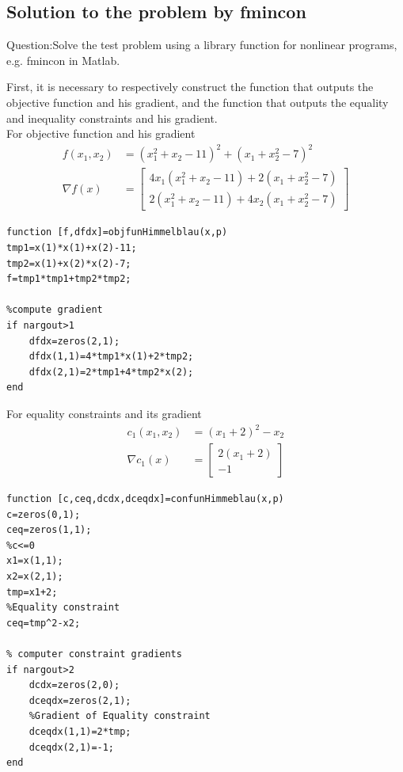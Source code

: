\subsection{\bfseries Solution to the problem by fmincon}
\begin{shaded}
{Question:Solve the test problem using a library function for nonlinear programs, e.g. fmincon in Matlab.}
\end{shaded}
First, it is necessary to respectively construct the function that outputs the objective function and his gradient, and the function that outputs the equality and inequality constraints and his gradient.\\[0.3cm]
For objective function and his gradient
\begin{align*}
    f(x_1,x_2)&=\left(x_1^2+x_2-11\right)^2+\left(x_1+x_2^2-7\right)^2\\
    \nabla f(x)&=\left[\begin{array}{l}
4 x_{1}\left(x_{1}^{2}+x_{2}-11\right)+2\left(x_{1}+x_{2}^{2}-7\right) \\
2\left(x_{1}^{2}+x_{2}-11\right)+4 x_{2}\left(x_{1}+x_{2}^{2}-7\right)
\end{array}\right]\tag{5.13}
\end{align*}
{\setmainfont{Courier New Bold} \scriptsize         
\begin{lstlisting}
function [f,dfdx]=objfunHimmelblau(x,p)
tmp1=x(1)*x(1)+x(2)-11;
tmp2=x(1)+x(2)*x(2)-7;
f=tmp1*tmp1+tmp2*tmp2;

%compute gradient
if nargout>1
    dfdx=zeros(2,1);
    dfdx(1,1)=4*tmp1*x(1)+2*tmp2;
    dfdx(2,1)=2*tmp1+4*tmp2*x(2);
end
\end{lstlisting}}
For equality constraints and its gradient
\begin{align*}
c_1(x_1,x_2)&=\left(x_1+2\right)^2-x_2\\
\nabla c_1(x)&=\left[\begin{array}{c}
2\left(x_{1}+2\right) \\
-1
\end{array}\right]\tag{5.14}
\end{align*}
{\setmainfont{Courier New Bold} \scriptsize         
\begin{lstlisting}
function [c,ceq,dcdx,dceqdx]=confunHimmeblau(x,p)
c=zeros(0,1);
ceq=zeros(1,1);
%c<=0  
x1=x(1,1);
x2=x(2,1);
tmp=x1+2;
%Equality constraint 
ceq=tmp^2-x2;

% computer constraint gradients
if nargout>2
    dcdx=zeros(2,0);
    dceqdx=zeros(2,1);
    %Gradient of Equality constraint
    dceqdx(1,1)=2*tmp;
    dceqdx(2,1)=-1;
end
\end{lstlisting}}
